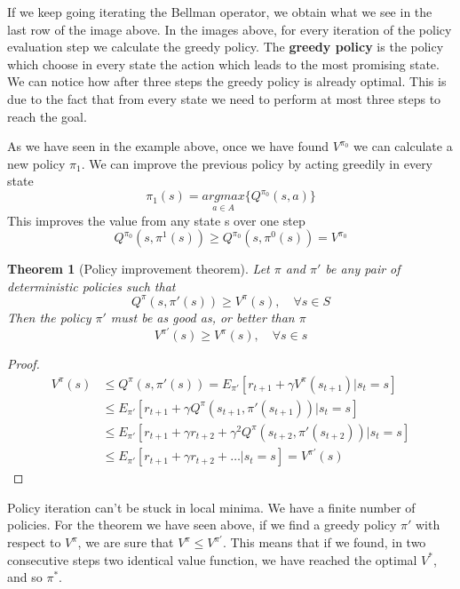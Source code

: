 \documentclass[main.tex]{subfiles}
\newtheorem{theorem}{Theorem}[section]
\begin{document}
If we keep going iterating the Bellman operator, we obtain what we see in the last row of the image above. In the images above, for every iteration of the policy evaluation step we calculate the greedy policy. The \textbf{greedy policy} is the policy which choose in every state the action which leads to the most promising state. We can notice how after three steps the greedy policy is already optimal. This is due to the fact that from every state we need to perform at most three steps to reach the goal.
\newline
\par
\noindent
As we have seen in the example above, once we have found $V^{\pi_0}$ we can calculate a new policy $\pi_1$. We can improve the previous policy by acting greedily in every state
\begin{equation*}
    \pi_1(s) = \underset{a \in A}{argmax} \bigg\{ Q^{\pi_0}(s,a) \bigg\}
\end{equation*}
This improves the value from any state s over one step
\begin{equation*}
    Q^{\pi_0}(s, \pi^1(s)) \geq Q^{\pi_0}(s, \pi^0(s)) = V^{\pi_0}
\end{equation*}

\begin{theorem}[Policy improvement theorem]
Let $\pi$ and $\pi'$ be any pair of deterministic policies such that
\begin{equation*}
    Q^{\pi}(s, \pi'(s)) \geq V^{\pi}(s), \quad \forall s \in S
\end{equation*}
Then the policy $\pi'$ must be as good as, or better than $\pi$
\begin{equation*}
    V^{\pi'}(s) \geq V^{\pi}(s), \quad \forall s \in s
\end{equation*}
\end{theorem}
\begin{proof}
\begin{align*}
    V^{\pi}(s) &\leq Q^{\pi}(s,\pi'(s)) = E_{\pi'}[r_{t+1} + \gamma V^{\pi}(s_{t+1})|s_t=s] \\
    &\leq E_{\pi'}[r_{t+1} + \gamma Q^{\pi}(s_{t+1}, \pi'(s_{t+1}))|s_t=s] \\
    &\leq E_{\pi'}[r_{t+1} + \gamma r_{t+2} + \gamma^2 Q^{\pi}(s_{t+2}, \pi'(s_{t+2}))|s_t=s] \\
    &\leq E_{\pi'}[r_{t+1} + \gamma r_{t+2} + \dots|s_t=s] = V^{\pi'}(s)
\end{align*}
\end{proof}
\par
\noindent
Policy iteration can't be stuck in local minima. We have a finite number of policies. For the theorem we have seen above, if we find a greedy policy $\pi'$ with respect to $V^{\pi}$, we are sure that $V^{\pi} \leq V^{\pi'}$. This means that if we found, in two consecutive steps two identical value function, we have reached the optimal $V^*$, and so $\pi^*$.
\end{document}
